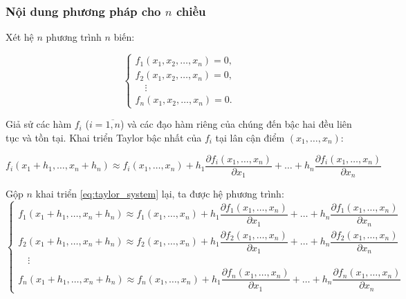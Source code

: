 
\subsubsection{Nội dung phương pháp cho $n$ chiều}

Xét hệ $n$ phương trình $n$ biến:

\begin{equation}
    \begin{cases}
        f_1(x_1, x_2, \dots, x_n) = 0, \\
        f_2(x_1, x_2, \dots, x_n) = 0, \\
        \quad \vdots \\
        f_n(x_1, x_2, \dots, x_n) = 0.
    \end{cases}
    \label{eq:system}
\end{equation}

Giả sử các hàm $f_i$ ($i = \overline{1,n}$) và các đạo hàm riêng của chúng đến bậc hai đều liên tục và tồn tại. Khai triển Taylor bậc nhất của $f_i$ tại lân cận điểm $(x_1,\dots,x_n)$:

\begin{equation}
   f_i(x_1 +h_1,\dots,x_n+h_n) \approx f_i(x_1,\dots,x_n) + h_1\dfrac{\partial f_i (x_1,\dots,x_n)}{\partial x_1} + \dots + h_n\dfrac{\partial f_i (x_1,\dots,x_n)}{\partial x_n}
   \label{eq:taylor_system}
\end{equation}

Gộp $n$ khai triển \eqref{eq:taylor_system} lại, ta được hệ phương trình:
\begin{equation}
\begin{cases}
 f_1(x_1 +h_1,\dots,x_n+h_n) \approx f_1(x_1,\dots,x_n) + h_1\dfrac{\partial f_1 (x_1,\dots,x_n)}{\partial x_1} + \dots + h_n\dfrac{\partial f_1 (x_1,\dots,x_n)}{\partial x_n} \\
 f_2(x_1 +h_1,\dots,x_n+h_n) \approx f_2(x_1,\dots,x_n) + h_1\dfrac{\partial f_2 (x_1,\dots,x_n)}{\partial x_1} + \dots + h_n\dfrac{\partial f_2 (x_1,\dots,x_n)}{\partial x_n} \\
 \quad \vdots \\
 f_n(x_1 +h_1,\dots,x_n+h_n) \approx f_n(x_1,\dots,x_n) + h_1\dfrac{\partial f_n (x_1,\dots,x_n)}{\partial x_1} + \dots + h_n\dfrac{\partial f_n (x_1,\dots,x_n)}{\partial x_n}
\end{cases}
\label{eq:linear_system}
\end{equation}

